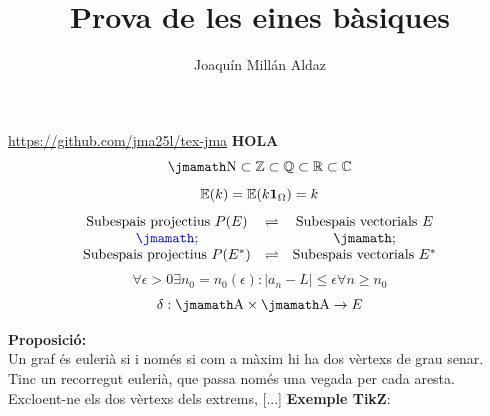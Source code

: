 \documentclass[catalan]{article}
\title{Prova de les eines bàsiques}
\author{Joaquín Millán Aldaz}
\begin{document}
\url{https://github.com/jma25l/tex-jma}
\titulo
\textbf{HOLA}\\
\[\N \subset \Z \subset \Q \subset \R \subset \C \]
\[\mathbb E(k) = \mathbb E(k\mathbf{1}_\Omega) = k\]
\[
	\begin{array}{ccc}
	\text{Subespais projectius } P(E) & \biy & \text{Subespais vectorials }E\\
	{\color{blue} \biyV} & & \biyV\\ 
		\text{Subespais projectius } P(E^{*}) & \biy & \text{Subespais vectorials }E^{*}\\
	\end{array}
\]
\[\forall\epsilon > 0\exists n_0 = n_0(\epsilon): |a_n-L|\leq \epsilon \forall n \geq n_0\]
\[\delta:\A\times\A\to E\]

\textbf{Proposició: }\\
Un graf és eulerià si i només si com a màxim hi ha dos vèrtexs de grau senar. 
\directa
Tinc un recorregut eulerià, que passa només una vegada per cada aresta. Excloent-ne els dos vèrtexs dels extrems, [...]
\reciproc
[...] 
\textbf{Exemple TikZ}: \\
\begin{center}
	
\end{center}
\end{document}
